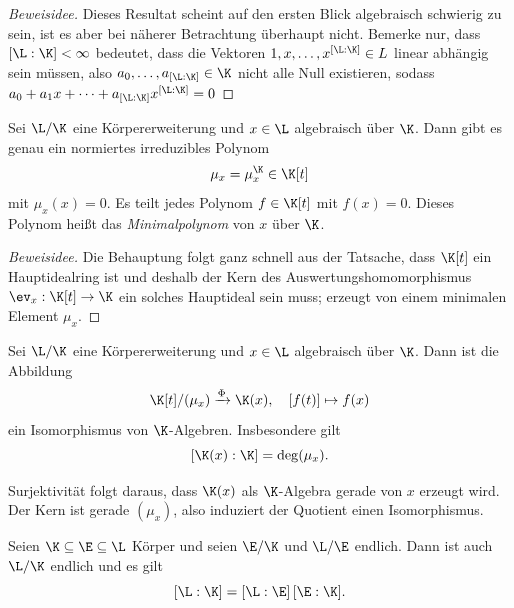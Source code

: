 \documentclass[11pt, a4paper]{article}
\begin{document}
\begin{proof}[Beweisidee] Dieses Resultat scheint auf den ersten Blick algebraisch schwierig zu sein, ist es aber bei näherer Betrachtung überhaupt nicht. Bemerke nur, dass $[\L:\K]<\infty$ bedeutet, dass die Vektoren $1,x,\dots, x^{[\L:\K]}\in L$ linear abhängig sein müssen, also $a_0,\dots ,a_{[\L:\K]}\in \K$ nicht alle Null existieren, sodass $a_0+a_1x+\dots +a_{[\L:\K]}x^{[\L:\K]} = 0$
    
\end{proof}

\begin{lemma}[Minimalpolynom] \Theorem
    Sei $\L/\K$ eine Körpererweiterung und $x \in \L$ algebraisch über $\K$. Dann gibt es genau ein normiertes irreduzibles Polynom
    $$\mu_x = \mu_x^\K \in \K[t]$$
    mit $\mu_x(x) = 0$. Es teilt jedes Polynom $f \in \K[t]$ mit $f(x) = 0$. Dieses Polynom heißt das \emph{Minimalpolynom} von $x$ über $\K$.
    
    \begin{proof}[Beweisidee] Die Behauptung folgt ganz schnell aus der Tatsache, dass $\K[t]$ ein Hauptidealring ist und deshalb der Kern des Auswertungshomomorphismus $\ev_x : \K[t] \to \K$ ein solches Hauptideal sein muss; erzeugt von einem minimalen Element $\mu_x$.
\end{proof}

\end{lemma}



\begin{lemma}[Gradformel] \Theorem Sei $\L/\K$ eine Körpererweiterung und $x \in \L$ algebraisch über $\K$. Dann ist die Abbildung
    $$\K[t]/(\mu_x) \xrightarrow{\Phi} \K(x), \quad [f(t)] \mapsto f(x)$$
    ein Isomorphismus von $\K$-Algebren. Insbesondere gilt
    $$[\K(x):\K] = \deg(\mu_x).$$
\end{lemma}

\begin{note}
    Surjektivität folgt daraus, dass $\K(x)$ als $\K$-Algebra gerade von $x$ erzeugt wird. Der Kern ist gerade $(\mu_x)$, also induziert der Quotient einen Isomorphismus.
\end{note}

\begin{theorem}[Turmformel] \Theorem
    Seien $\K \subseteq \E \subseteq \L$ Körper und seien $\E/\K$ und $\L/\E$ endlich. Dann ist auch $\L/\K$ endlich und es gilt
    $$[\L:\K] = [\L:\E]\,[\E:\K].$$
\end{theorem}
\end{document}
